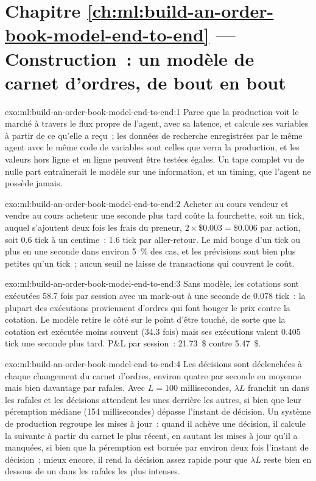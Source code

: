 \section*{Chapitre \ref{ch:ml:build-an-order-book-model-end-to-end} --- Construction~: un modèle de carnet d'ordres, de bout en bout}

\begin{solution}{exo:ml:build-an-order-book-model-end-to-end:1}
Parce que la production voit le marché à travers le flux propre de l'agent, avec sa latence, et calcule ses variables à partir de ce qu'elle a
reçu~; les données de recherche enregistrées par le même agent avec le même code de variables sont celles que verra la production, et les valeurs hors ligne et
en ligne peuvent être testées égales. Un tape complet vu de nulle part entraînerait le modèle sur une information, et un timing, que l'agent
ne possède jamais.
\end{solution}

\begin{solution}{exo:ml:build-an-order-book-model-end-to-end:2}
Acheter au cours vendeur et vendre au cours acheteur une seconde plus tard coûte la fourchette, soit un tick, auquel s'ajoutent deux fois les frais du preneur, $2\times\$0.003=\$0.006$
par action, soit 0.6 tick à un centime~: 1.6 tick par aller-retour. Le mid bouge d'un tick ou plus en une seconde dans environ 5~\% des cas, et
les prévisions sont bien plus petites qu'un tick~; aucun seuil ne laisse de transactions qui couvrent le coût.
\end{solution}

\begin{solution}{exo:ml:build-an-order-book-model-end-to-end:3}
Sans modèle, les cotations sont exécutées 58.7 fois par session avec un mark-out à une seconde de 0.078 tick~: la plupart des exécutions proviennent d'ordres
qui font bouger le prix contre la cotation. Le modèle retire le côté sur le point d'être touché, de sorte que la cotation est exécutée moins souvent (34.3 fois) mais
ses exécutions valent 0.405 tick une seconde plus tard. P\&L par session~: 21.73~\$ contre 5.47~\$.
\end{solution}

\begin{solution}{exo:ml:build-an-order-book-model-end-to-end:4}
Les décisions sont déclenchées à chaque changement du carnet d'ordres, environ quatre par seconde en moyenne mais bien davantage par rafales. Avec $L=100$ millisecondes,
$\lambda L$ franchit un dans les rafales et les décisions attendent les unes derrière les autres, si bien que leur péremption médiane (154 millisecondes) dépasse
l'instant de décision. Un système de production regroupe les mises à jour~: quand il achève une décision, il calcule la suivante à partir du carnet le plus récent, en sautant
les mises à jour qu'il a manquées, si bien que la péremption est bornée par environ deux fois l'instant de décision~; mieux encore, il rend la décision assez rapide
pour que $\lambda L$ reste bien en dessous de un dans les rafales les plus intenses.
\end{solution}

